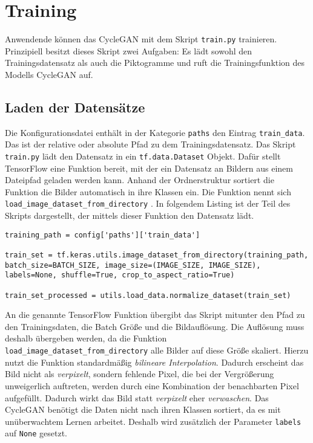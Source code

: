 \section{Training}
Anwendende können das \ac{CycleGAN} mit dem Skript \texttt{train.py} trainieren. Prinzipiell besitzt dieses Skript zwei Aufgaben: Es lädt sowohl den Trainingsdatensatz als auch die Piktogramme und ruft die Trainingsfunktion des Modells \ac{CycleGAN} auf.

\subsection{Laden der Datensätze}
Die Konfigurationsdatei enthält in der Kategorie \texttt{paths} den Eintrag \texttt{train_data}. Das ist der relative oder absolute Pfad zu dem Trainingsdatensatz. Das Skript \texttt{train.py} lädt den Datensatz in ein \texttt{tf.data.Dataset} Objekt. Dafür stellt TensorFlow eine Funktion bereit, mit der ein Datensatz an Bildern aus einem Dateipfad geladen werden kann. Anhand der Ordnerstruktur sortiert die Funktion die Bilder automatisch in ihre Klassen ein. Die Funktion nennt sich \texttt{load_image_dataset_from_directory} \cite{tf-keras-utils}. In folgendem Listing ist der Teil des Skripts dargestellt, der mittels dieser Funktion den Datensatz lädt.

\begin{code}
   \label{code:train-set-laden}
   \begin{verbatim}
training_path = config['paths']['train_data']

train_set = tf.keras.utils.image_dataset_from_directory(training_path, batch_size=BATCH_SIZE, image_size=(IMAGE_SIZE, IMAGE_SIZE), labels=None, shuffle=True, crop_to_aspect_ratio=True)

train_set_processed = utils.load_data.normalize_dataset(train_set)
   \end{verbatim}
\end{code}

An die genannte TensorFlow Funktion übergibt das Skript mitunter den Pfad zu den Trainingsdaten, die Batch Größe und die Bildauflösung. Die Auflösung muss deshalb übergeben werden, da die Funktion \texttt{load_image_dataset_from_directory} alle Bilder auf diese Größe skaliert. Hierzu nutzt die Funktion standardmäßig \emph{bilineare Interpolation}. Dadurch erscheint das Bild nicht als \emph{verpixelt}, sondern fehlende Pixel, die bei der Vergrößerung unweigerlich auftreten, werden durch eine Kombination der benachbarten Pixel aufgefüllt. Dadurch wirkt das Bild statt \emph{verpixelt} eher \emph{verwaschen}. Das \ac{CycleGAN} benötigt die Daten nicht nach ihren Klassen sortiert, da es mit unüberwachtem Lernen arbeitet. Deshalb wird zusätzlich der Parameter \texttt{labels} auf \texttt{None} gesetzt.

